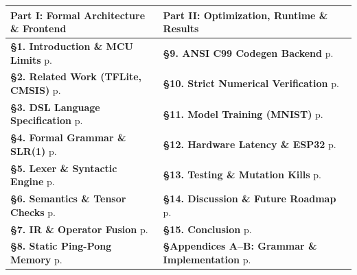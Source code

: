 \documentclass[11pt,a4paper]{article}
\begin{document}
\begin{titlepage}
\noindent
\begin{tabular*}{\textwidth}{@{\extracolsep{\fill}} p{} p{} @{}}
\toprule
\textbf{Part I: Formal Architecture \& Frontend} & \textbf{Part II: Optimization, Runtime \& Results} \\
\midrule
\textbf{\S 1. Introduction \& MCU Limits} \dotfill p.~\pageref{sec:introduction} & \textbf{\S 9. ANSI C99 Codegen Backend} \dotfill p.~\pageref{sec:codegen} \\
\textbf{\S 2. Related Work (TFLite, CMSIS)} \dotfill p.~\pageref{sec:related_work} & \textbf{\S 10. Strict Numerical Verification} \dotfill p.~\pageref{sec:verification} \\
\textbf{\S 3. DSL Language Specification} \dotfill p.~\pageref{sec:dsl_spec} & \textbf{\S 11. Model Training (MNIST)} \dotfill p.~\pageref{sec:training} \\
\textbf{\S 4. Formal Grammar \& SLR(1)} \dotfill p.~\pageref{sec:formal_grammar} & \textbf{\S 12. Hardware Latency \& ESP32} \dotfill p.~\pageref{sec:evaluation} \\
\textbf{\S 5. Lexer \& Syntactic Engine} \dotfill p.~\pageref{sec:lex_parse} & \textbf{\S 13. Testing \& Mutation Kills} \dotfill p.~\pageref{sec:qa} \\
\textbf{\S 6. Semantics \& Tensor Checks} \dotfill p.~\pageref{sec:semantic} & \textbf{\S 14. Discussion \& Future Roadmap} \dotfill p.~\pageref{sec:comparative_eval} \\
\textbf{\S 7. IR \& Operator Fusion} \dotfill p.~\pageref{sec:ir_opt} & \textbf{\S 15. Conclusion} \dotfill p.~\pageref{sec:conclusion} \\
\textbf{\S 8. Static Ping-Pong Memory} \dotfill p.~\pageref{sec:memory_planning} & \textbf{\S Appendices A--B: Grammar \& Implementation} \dotfill p.~\pageref{app:grammar} \\
\bottomrule
\end{tabular*}

\vspace{0.8em}
\begin{center}
\footnotesize
{}
\end{center}
\end{titlepage}
\end{document}
